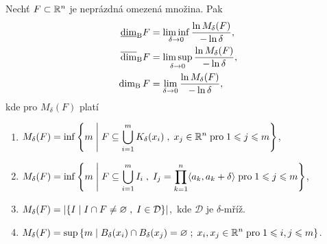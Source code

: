 \begin{theorem}\label{thm:ekvivalentni-def-box-counting-dimenze}
    Nechť $F\subset \mathbb{R}^n$ je neprázdná omezená množina. Pak
    \begin{align*}
        \underline{\dim}_\textup{B}{F}&=\liminf_{\delta\to 0}\dfrac{\ln{M_\delta(F)}}{-\ln{\delta}},\\
        \overline{\dim}_\textup{B}{F}&=\limsup_{\delta\to 0}\dfrac{\ln{M_\delta(F)}}{-\ln{\delta}},\\
        \operatorname{dim_B}{F}&=\lim_{\delta\to 0}\dfrac{\ln{M_\delta(F)}}{-\ln{\delta}},
    \end{align*}
    kde pro $M_\delta(F)$ platí
    \begin{enumerate}[label=(\roman*)]
        \item\label{thm:pokryti-delta-uz-koulemi} $\displaystyle M_\delta(F)=\inf\left\{m\;\middle|\;F\subseteq\bigcup\limits_{i=1}^m K_\delta(x_i)\;,\;x_j\in\mathbb{R}^n\;\text{pro}\;1\leqslant j\leqslant m\right\}$,
        \item\label{thm:pokryti-delta-kvadry} $\displaystyle M_\delta(F)=\inf\left\{m\;\middle|\;F\subseteq\bigcup\limits_{i=1}^m I_i\;,\;I_j=\prod_{k=1}^{n}\langle a_k,a_k+\delta\rangle\;\text{pro}\;1\leqslant j\leqslant m\right\}$,
        \item\label{thm:pokryti-delta-sit} $\displaystyle M_\delta(F)=\left|\left\{I\;\middle|\;I\cap F\neq\varnothing\;,\;I\in\mathcal{D}\right\}\right|$,~kde $\mathcal{D}$ je $\delta$-mříž.
        \item\label{thm:pokryti-delta-dis-ot-koulemi} $\displaystyle M_\delta(F)=\sup\left\{m\;\middle|\;B_\delta(x_i)\cap B_\delta(x_j)=\varnothing\;;\;x_i,x_j\in\mathbb{R}^n\;\text{pro}\;1\leqslant i,j\leqslant m\right\}$.
    \end{enumerate}
\end{theorem}

